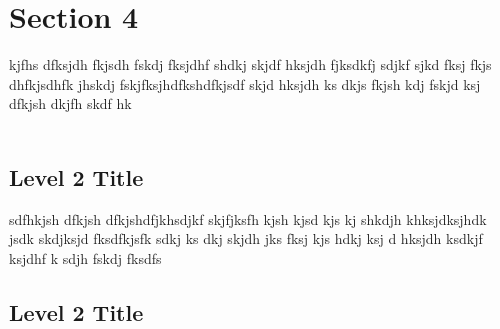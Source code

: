 





\section{Section 4}

\begin{flushleft}
    kjfhs dfksjdh fkjsdh fskdj fksjdhf shdkj skjdf hksjdh fjksdkfj sdjkf sjkd fksj fkjs dhfkjsdhfk jhskdj fskjfksjhdfkshdfkjsdf skjd hksjdh ks dkjs fkjsh kdj fskjd ksj dfkjsh dkjfh skdf hk \\~\\
\end{flushleft}

\subsection{Level 2 Title}

\begin{flushleft}
    sdfhkjsh dfkjsh dfkjshdfjkhsdjkf skjfjksfh kjsh kjsd kjs kj shkdjh khksjdksjhdk jsdk skdjksjd fksdfkjsfk sdkj ks dkj skjdh jks fksj kjs hdkj ksj d hksjdh ksdkjf ksjdhf k sdjh fskdj fksdfs 
\end{flushleft}

\subsection{Level 2 Title}